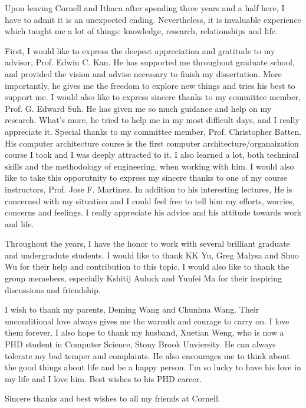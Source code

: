 \documentclass[master,tocprelim]{cornell}
\begin{document}
\begin{acknowledgements}
Upon leaving Cornell and Ithaca after spending three years and a half here, I have to admit it is an unexpected ending.
Nevertheless, it is invaluable experience which taught me a lot of things: knowledge, research, relationships and life. 

First, I would like 
to express the deepest appreciation and gratitude to my advisor, Prof. Edwin C. Kan.  He has supported me throughout 
graduate school, and provided the vision and advise necessary to finish my dissertation. More importantly, he gives me the 
freedom to explore new things and tries his best to support me. I would also like to express sincere thanks to my committee member, 
Prof. G. Edward Suh. He has given me so much guidance and help on my research. What's more, he tried to help me in my most 
difficult days, and I really appreciate it. Special thanks to my committee member, Prof. Christopher Batten. 
His computer architecture course is the first computer architecture/organaization course I took and I was deeply attracted to it.
I also learned 
a lot, both technical skills and the methodology of engineering, when working with him. I would also like
to take this opporutnity to express my sincere thanks to one of my course instructors, 
Prof. Jose F. Martinez. In addition to his interesting lectures, He is concerned with my situation and I could feel free to tell him my efforts, worries, concerns and feelings. I really 
appreciate his advice and his attitude towards work and life.

Throughout the years, I have the honor to work with several brilliant graduate and undergradute students. I would like to thank KK Yu, 
Greg Malysa and Shuo Wu for their help and contribution to this topic. I would also like to thank the group memebers, especially 
Kshitij Auluck and Yunfei Ma for their 
inspiring discussions and friendship.

I wish to thank my parents, Deming Wang and Chunhua Wang. Their unconditional love always gives me the warmth and courage to 
carry on. I love them forever. I also hope to thank my husband, Xuetian Weng, who is now a PHD student in Computer Science, Stony Brook 
Unviersity. He can always tolerate my bad temper and complaints. He also encourages me to think about the good things about life 
and be a happy person. I'm so lucky to have his love in my life and I love him. Best wishes to his PHD career.

Sincere thanks and best wishes to all my friends at Cornell.

\end{acknowledgements}

\contentspage
\tablelistpage
\figurelistpage

\normalspacing \setcounter{page}{1} 
\pagestyle{cornell} \addtolength{\parskip}{0.5\baselineskip}














\end{document}
